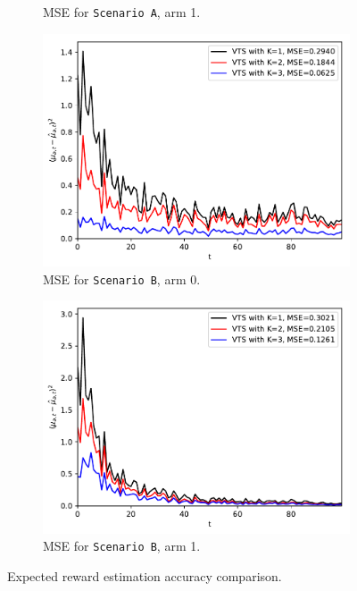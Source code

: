 \documentclass[10pt]{article}
\begin{document}
\begin{figure}[!h]
\begin{subfigure}[b]{0.46\textwidth}
		\caption{MSE for \texttt{Scenario A}, arm 1.}
		\label{fig:model_a_mse_arm_1}
	\end{subfigure}
	
	\begin{subfigure}[b]{0.48\textwidth}
		\includegraphics[width=\textwidth]{./figs/model_b_mse_arm_0.pdf}
		\caption{MSE for \texttt{Scenario B}, arm 0.}
		\label{fig:model_b_mse_arm_0}
	\end{subfigure}
	\begin{subfigure}[b]{0.48\textwidth}
		\includegraphics[width=\textwidth]{./figs/model_b_mse_arm_1.pdf}
		\caption{MSE for \texttt{Scenario B}, arm 1.}
		\label{fig:model_b_mse_arm_1}
	\end{subfigure}
	\caption{Expected reward estimation accuracy comparison.}
	\label{fig:mse_comparison}
\end{figure}
\end{document}
